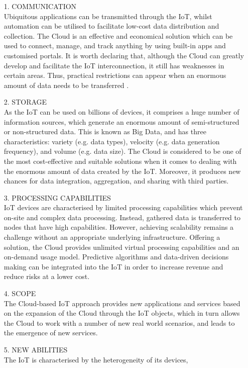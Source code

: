 \documentclass[11pt]{article}
\begin{document}
\begin{itemize}
  \item[1.] COMMUNICATION\\
Ubiquitous applications can be transmitted through the IoT, whilst automation can be utilised to facilitate low-cost data distribution and collection. The Cloud is an effective and economical solution which can be used to connect, manage, and track anything by using built-in apps and customised portals. It is worth declaring that, although the Cloud can greatly develop and facilitate the IoT interconnection, it still has weaknesses in certain areas. Thus, practical restrictions can appear when an enormous amount of data needs to be transferred . 
  \item[2.] STORAGE\\
As the IoT can be used on billions of devices, it comprises
a huge number of information sources, which generate an
enormous amount of semi-structured or non-structured data. This is known as Big Data, and has three characteristics: variety (e.g. data types), velocity (e.g. data generation
frequency), and volume (e.g. data size). The Cloud is
considered to be one of the most cost-effective and suitable
solutions when it comes to dealing with the enormous amount
of data created by the IoT. Moreover, it produces new chances
for data integration, aggregation, and sharing with third parties. 
  \item[3.]PROCESSING CAPABILITIES\\
IoT devices are characterised by limited processing
capabilities which prevent on-site and complex data
processing. Instead, gathered data is transferred to nodes that
have high capabilities. However, achieving scalability
remains a challenge without an appropriate underlying
infrastructure. Offering a solution, the Cloud provides
unlimited virtual processing capabilities and an on-demand
usage model. Predictive algorithms and data-driven
decisions making can be integrated into the IoT in order to
increase revenue and reduce risks at a lower cost.
  \item[4.] SCOPE\\
The Cloud-based IoT approach provides new applications and services based on the expansion of the Cloud through the IoT objects, which in turn allows the Cloud to work with a number of new real world scenarios, and leads to the emergence of new services.
\item[5.] NEW ABILITIES\\
The IoT is characterised by the heterogeneity of its devices,

\end{itemize}
\end{document}
